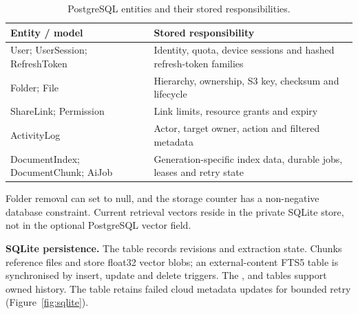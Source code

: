 \begin{table}[htbp]
\centering
\begin{tabularx}{\textwidth}{@{}p{5.6cm}L@{}}
\toprule
\textbf{Entity / model} & \textbf{Stored responsibility}\\
\midrule
User; UserSession; RefreshToken & Identity, quota, device sessions and hashed refresh-token families\\
Folder; File & Hierarchy, ownership, S3 key, checksum and lifecycle\\
ShareLink; Permission & Link limits, resource grants and expiry\\
ActivityLog & Actor, target owner, action and filtered metadata\\
DocumentIndex; DocumentChunk; AiJob & Generation-specific index data, durable jobs, leases and retry state\\
\bottomrule
\end{tabularx}
\caption{PostgreSQL entities and their stored responsibilities.}
\label{tab:entities}
\end{table}

Folder removal can set  to null, and the storage counter has a non-negative database constraint. Current retrieval vectors reside in the private SQLite store, not in the optional PostgreSQL vector field.

\textbf{SQLite persistence.} The  table records revisions and extraction state. Chunks reference files and store float32 vector blobs; an external-content FTS5 table is synchronised by insert, update and delete triggers. The ,  and  tables support owned history. The  table retains failed cloud metadata updates for bounded retry (Figure~\ref{fig:sqlite}).

